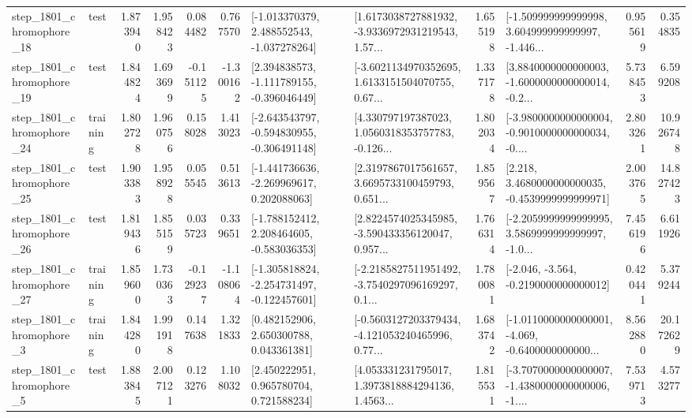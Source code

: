 \begin{tabular}{llrrrrllrlrr}
 step\_1801\_chromophore\_18 &      test &      1.873940 &    1.958423 &      0.084482 &  0.767570 &   [-1.013370379, 2.488552543, -1.037278264] &  [1.6173038727881932, -3.9336972931219543, 1.57... &       1.655198 &  [-1.509999999999998, 3.604999999999997, -1.446... &            0.955619 &          0.354835 \\
 step\_1801\_chromophore\_19 &      test &      1.844824 &    1.693699 &     -0.151125 & -1.300162 &   [2.394838573, -1.111789155, -0.396046449] &  [-3.6021134970352695, 1.6133151504070755, 0.67... &       1.337178 &  [3.8840000000000003, -1.6000000000000014, -0.2... &            5.738453 &          6.599208 \\
 step\_1801\_chromophore\_24 &  training &      1.802728 &    1.960756 &      0.158028 &  1.413023 &  [-2.643543797, -0.594830955, -0.306491148] &  [4.330797197387023, 1.0560318353757783, -0.126... &       1.802034 &  [-3.9800000000000004, -0.9010000000000034, -0.... &            2.803261 &         10.926748 \\
 step\_1801\_chromophore\_25 &      test &      1.903383 &    1.958928 &      0.055545 &  0.513613 &   [-1.441736636, -2.269969617, 0.202088063] &  [2.3197867017561657, 3.6695733100459793, 0.651... &       1.859567 &   [2.218, 3.4680000000000035, -0.4539999999999971] &            2.003765 &         14.827423 \\
 step\_1801\_chromophore\_26 &      test &      1.819436 &    1.855159 &      0.035723 &  0.339651 &   [-1.788152412, 2.208464605, -0.583036353] &  [2.8224574025345985, -3.590433356120047, 0.957... &       1.766314 &  [-2.2059999999999995, 3.5869999999999997, -1.0... &            7.456196 &          6.611926 \\
 step\_1801\_chromophore\_27 &  training &      1.859600 &    1.730363 &     -0.129237 & -1.108064 &  [-1.305818824, -2.254731497, -0.122457601] &  [-2.2185827511951492, -3.7540297096169297, 0.1... &       1.780081 &              [-2.046, -3.564, -0.2190000000000012] &            0.420441 &          5.379244 \\
  step\_1801\_chromophore\_3 &  training &      1.844280 &    1.991918 &      0.147638 &  1.321833 &     [0.482152906, 2.650300788, 0.043361381] &  [-0.5603127203379434, -4.121053240465996, 0.77... &       1.683742 &  [-1.0110000000000001, -4.069, -0.6400000000000... &            8.562880 &         20.172629 \\
  step\_1801\_chromophore\_5 &      test &      1.883845 &    2.007121 &      0.123276 &  1.108032 &     [2.450222951, 0.965780704, 0.721588234] &  [4.053331231795017, 1.3973818884294136, 1.4563... &       1.815531 &  [-3.7070000000000007, -1.4380000000000006, -1.... &            7.539713 &          4.573277 \\

\end{tabular}

